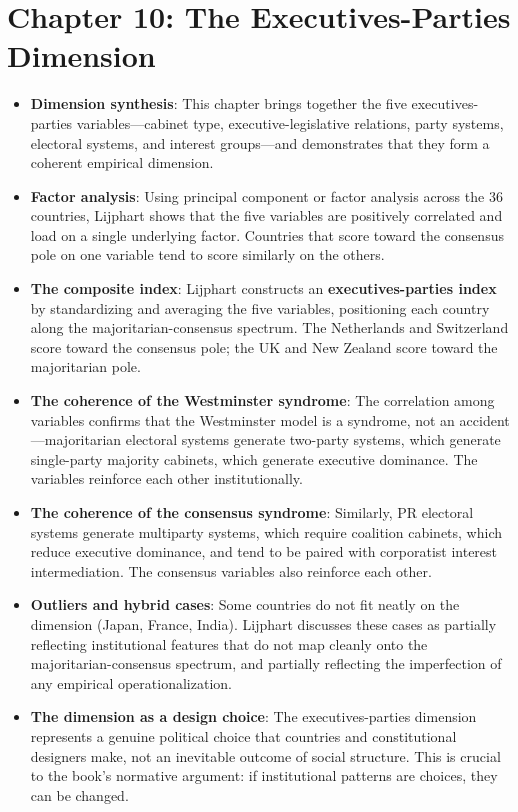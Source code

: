 \documentclass[12pt]{article}
\begin{document}
\section{Chapter 10: The Executives-Parties Dimension}

\begin{itemize}[leftmargin=*, itemsep=4pt]
    \item \textbf{Dimension synthesis}: This chapter brings together the five executives-parties variables---cabinet type, executive-legislative relations, party systems, electoral systems, and interest groups---and demonstrates that they form a coherent empirical dimension.
    \item \textbf{Factor analysis}: Using principal component or factor analysis across the 36 countries, Lijphart shows that the five variables are positively correlated and load on a single underlying factor. Countries that score toward the consensus pole on one variable tend to score similarly on the others.
    \item \textbf{The composite index}: Lijphart constructs an \textbf{executives-parties index} by standardizing and averaging the five variables, positioning each country along the majoritarian-consensus spectrum. The Netherlands and Switzerland score toward the consensus pole; the UK and New Zealand score toward the majoritarian pole.
    \item \textbf{The coherence of the Westminster syndrome}: The correlation among variables confirms that the Westminster model is a syndrome, not an accident---majoritarian electoral systems generate two-party systems, which generate single-party majority cabinets, which generate executive dominance. The variables reinforce each other institutionally.
    \item \textbf{The coherence of the consensus syndrome}: Similarly, PR electoral systems generate multiparty systems, which require coalition cabinets, which reduce executive dominance, and tend to be paired with corporatist interest intermediation. The consensus variables also reinforce each other.
    \item \textbf{Outliers and hybrid cases}: Some countries do not fit neatly on the dimension (Japan, France, India). Lijphart discusses these cases as partially reflecting institutional features that do not map cleanly onto the majoritarian-consensus spectrum, and partially reflecting the imperfection of any empirical operationalization.
    \item \textbf{The dimension as a design choice}: The executives-parties dimension represents a genuine political choice that countries and constitutional designers make, not an inevitable outcome of social structure. This is crucial to the book's normative argument: if institutional patterns are choices, they can be changed.
\end{itemize}
\end{document}
